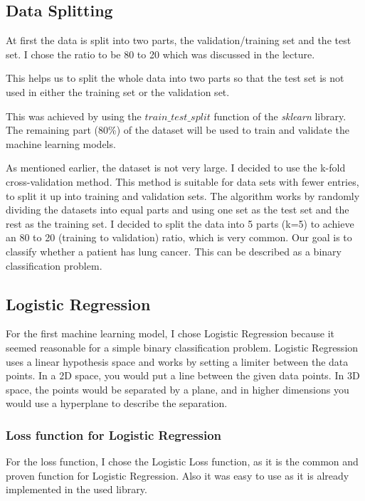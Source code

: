 \documentclass[a4paper,12pt]{article}
\begin{document}
\subsection{Data Splitting}
\label{sec:orga7053a3}
At first the data is split into two parts, the validation/training set and the test set. I chose the ratio to be 80 to 20 which was discussed in the lecture.

This helps us to split the whole data into two parts so that the test set is not used in either the training set or the validation set.

This was achieved by using the \(train\_test\_split\) function of the \emph{sklearn} library.
The remaining part (80\%) of the dataset will be used to train and validate the machine learning models.

As mentioned earlier, the dataset is not very large.
I decided to use the k-fold cross-validation method.
This method is suitable for data sets with fewer entries, to split it up into training and validation sets.
The algorithm works by randomly dividing the datasets into equal parts and using one set as the test set and the rest as the training set.
I decided to split the data into 5 parts (k=5) to achieve an 80 to 20 (training to validation) ratio, which is very common.
Our goal is to classify whether a patient has lung cancer. This can be described as a binary classification problem.

\subsection{Logistic Regression}
\label{sec:orgb62ec90}
For the first machine learning model, I chose Logistic Regression because it seemed reasonable for a simple binary classification problem.
Logistic Regression uses a linear hypothesis space and works by setting a limiter between the data points.
In a 2D space, you would put a line between the given data points. In 3D space, the points would be separated by a plane, and in higher dimensions you would use a hyperplane to describe the separation.

\subsubsection{Loss function for Logistic Regression}
\label{sec:org3f58b00}
For the loss function, I chose the Logistic Loss function, as it is the common and proven function for Logistic Regression. Also it was easy to use as it is already implemented in the used library.
\end{document}
